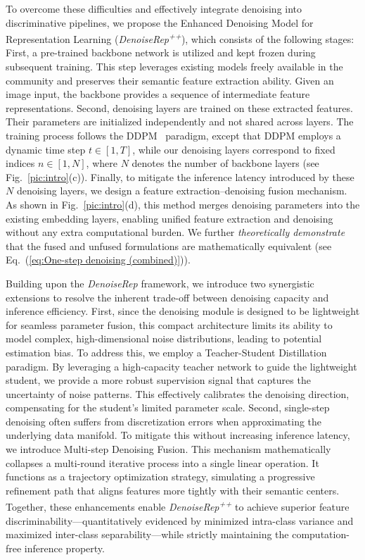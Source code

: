 \documentclass[conference]{IEEEtran}
\begin{document}
To overcome these difficulties and effectively integrate denoising into discriminative pipelines, we propose the Enhanced Denoising Model for Representation Learning (\textit{DenoiseRep\textsuperscript{++}}), which consists of the following stages:
%
First, a pre-trained backbone network is utilized and kept frozen during subsequent training. This step leverages existing models freely available in the community and preserves their semantic feature extraction ability. Given an image input, the backbone provides a sequence of intermediate feature representations.
%
Second, denoising layers are trained on these extracted features. Their parameters are initialized independently and not shared across layers. The training process follows the DDPM~\cite{ho2020denoising} paradigm, except that DDPM employs a dynamic time step $t \in [1, T]$, while our denoising layers correspond to fixed indices $n \in [1, N]$, where $N$ denotes the number of backbone layers (see Fig.~\ref{pic:intro}(c)).
%
Finally, to mitigate the inference latency introduced by these $N$ denoising layers, we design a feature extraction–denoising fusion mechanism.
As shown in Fig.~\ref{pic:intro}(d), this method merges denoising parameters into the existing embedding layers, enabling unified feature extraction and denoising without any extra computational burden.
We further \textit{theoretically demonstrate} that the fused and unfused formulations are mathematically equivalent (see Eq.~(\ref{eq:One-step denoising (combined)})).


Building upon the \textit{DenoiseRep} framework, we introduce two synergistic extensions to resolve the inherent trade-off between denoising capacity and inference efficiency.
First, since the denoising module is designed to be lightweight for
seamless parameter fusion, this compact architecture limits its ability
to model complex, high-dimensional noise distributions, leading to
potential estimation bias. To address this, we employ a Teacher-Student Distillation paradigm. By leveraging a high-capacity teacher network to guide the lightweight student, we provide a more robust supervision signal that captures the uncertainty of noise patterns. This effectively calibrates the denoising direction, compensating for the student's limited parameter scale.
Second, single-step denoising often suffers from discretization errors when approximating the underlying data manifold. To mitigate this without increasing inference latency, we introduce Multi-step Denoising Fusion. This mechanism mathematically collapses a multi-round iterative process into a single linear operation. It functions as a trajectory optimization strategy, simulating a progressive refinement path that aligns features more tightly with their semantic centers.
Together, these enhancements enable \textit{DenoiseRep\textsuperscript{++}} to achieve superior feature discriminability—quantitatively evidenced by minimized intra-class variance and maximized inter-class separability—while strictly maintaining the computation-free inference property.
\end{document}
